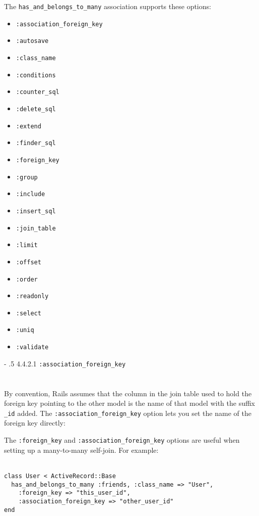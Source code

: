 \documentclass[10pt]{book}
\makeatletter
\renewcommand\paragraph{%
   \@startsection{paragraph}{4}{0mm}%
      {-\baselineskip}%
      {.5\baselineskip}%
      {\normalfont\scriptsize\bfseries}}
\makeatother
\begin{document}
The \texttt{has\_and\_belongs\_to\_many} association supports these options:
\begin{itemize}
	\item \texttt{:association\_foreign\_key}
	\item \texttt{:autosave}
	\item \texttt{:class\_name}
	\item \texttt{:conditions}
	\item \texttt{:counter\_sql}
	\item \texttt{:delete\_sql}
	\item \texttt{:extend}
	\item \texttt{:finder\_sql}
	\item \texttt{:foreign\_key}
	\item \texttt{:group}
	\item \texttt{:include}
	\item \texttt{:insert\_sql}
	\item \texttt{:join\_table}
	\item \texttt{:limit}
	\item \texttt{:offset}
	\item \texttt{:order}
	\item \texttt{:readonly}
	\item \texttt{:select}
	\item \texttt{:uniq}
	\item \texttt{:validate}
\end{itemize}

\paragraph{4.4.2.1 \texttt{:association\_foreign\_key}}\\ \\\\

By convention, Rails assumes that the column in the join table used  to hold the foreign key pointing to the other model is the name of that  model with the suffix \texttt{\_id} added. The \texttt{:association\_foreign\_key} option lets you set the name of the foreign key directly:

The \texttt{:foreign\_key} and \texttt{:association\_foreign\_key} options are useful when setting up a many-to-many self-join. For example:
\\ \\
\begin{minipage}{\textwidth}{\scriptsize
\begin{verbatim}
class User < ActiveRecord::Base
  has_and_belongs_to_many :friends, :class_name => "User",
    :foreign_key => "this_user_id",
    :association_foreign_key => "other_user_id"
end
\end{verbatim}}
\end{minipage}
\\ \\
\end{document}
